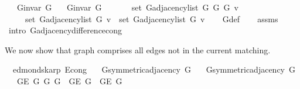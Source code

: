 \begin{isabellebody}
\ \ \ {\isachardoublequoteopen}G{\isachardot}{\kern0pt}invar\ G{\isachardoublequoteclose}\isanewline
\ \ \ {\isachardoublequoteopen}G{\isachardot}{\kern0pt}invar\ G{\isacharprime}{\kern0pt}{\isachardoublequoteclose}\isanewline
\ \ \isanewline
\ \ \ \ {\isachardoublequoteopen}set\ {\isacharparenleft}{\kern0pt}G{\isachardot}{\kern0pt}adjacency{\isacharunderscore}{\kern0pt}list\ {\isacharparenleft}{\kern0pt}G{}\ G\ G{\isacharprime}{\kern0pt}{\isacharparenright}{\kern0pt}\ v{\isacharparenright}{\kern0pt}\ {\isacharequal}{\kern0pt}\isanewline
\ \ \ \ \ set\ {\isacharparenleft}{\kern0pt}G{\isachardot}{\kern0pt}adjacency{\isacharunderscore}{\kern0pt}list\ G\ v{\isacharparenright}{\kern0pt}\ {\isacharminus}{\kern0pt}\ set\ {\isacharparenleft}{\kern0pt}G{\isachardot}{\kern0pt}adjacency{\isacharunderscore}{\kern0pt}list\ G{\isacharprime}{\kern0pt}\ v{\isacharparenright}{\kern0pt}{\isachardoublequoteclose}%
\endisataginvisible
{\isafoldinvisible}%
%
\isadeliminvisible
\isanewline
%
\endisadeliminvisible
%
\isadelimproof
\ \ %
\endisadelimproof
%
\isatagproof
{}\isamarkupfalse%
\ G{}{\isacharunderscore}{\kern0pt}def\isanewline
\ \ \isamarkupfalse%
\ assms\isanewline
\ \ \isamarkupfalse%
\ {\isacharparenleft}{\kern0pt}intro\ G{\isachardot}{\kern0pt}adjacency{\isacharunderscore}{\kern0pt}difference{\isacharunderscore}{\kern0pt}cong{\isacharparenright}{\kern0pt}%
\endisatagproof
{\isafoldproof}%
%
\isadelimproof
%
\endisadelimproof
%
\begin{isamarkuptext}%
We now show that graph  comprises all edges not in the current matching.%
\end{isamarkuptext}\isamarkuptrue%
\isamarkupfalse%
\ {\isacharparenleft}{\kern0pt}\ edmonds{\isacharunderscore}{\kern0pt}karp{\isacharparenright}{\kern0pt}\ E{}{\isacharunderscore}{\kern0pt}cong{\isacharcolon}{\kern0pt}\isanewline
\ \ \ {\isachardoublequoteopen}G{\isachardot}{\kern0pt}symmetric{\isacharunderscore}{\kern0pt}adjacency{\isacharprime}{\kern0pt}\ G{\isachardoublequoteclose}\isanewline
\ \ \ {\isachardoublequoteopen}G{\isachardot}{\kern0pt}symmetric{\isacharunderscore}{\kern0pt}adjacency{\isacharprime}{\kern0pt}\ G{\isacharprime}{\kern0pt}{\isachardoublequoteclose}\isanewline
\ \ \ {\isachardoublequoteopen}G{\isachardot}{\kern0pt}E\ {\isacharparenleft}{\kern0pt}G{}\ G\ G{\isacharprime}{\kern0pt}{\isacharparenright}{\kern0pt}\ {\isacharequal}{\kern0pt}\ G{\isachardot}{\kern0pt}E\ G\ {\isacharminus}{\kern0pt}\ G{\isachardot}{\kern0pt}E\ G{\isacharprime}{\kern0pt}{\isachardoublequoteclose}\isanewline

\end{isabellebody}
